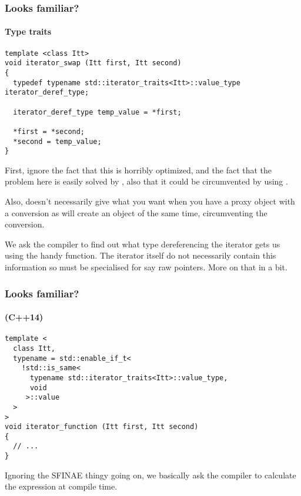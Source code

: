 \documentclass[11pt,a4paper,dvipsnames,usenames]{beamer}
\begin{document}
\begin{frame}[fragile]
  \frametitle{Looks familiar?}
  \framesubtitle{Type traits}

  \begin{lstlisting}
template <class Itt>
void iterator_swap (Itt first, Itt second)
{
  typedef typename std::iterator_traits<Itt>::value_type iterator_deref_type;

  iterator_deref_type temp_value = *first;

  *first = *second;
  *second = temp_value;
}
  \end{lstlisting}

  \note
  {
    First, ignore the fact that this is horribly optimized, and the fact that the problem here
    is easily solved by , also that it could be circumvented by using .

    \vspace{1em}

    Also,  doesn't necessarily give what you want when you have a proxy object with a conversion
    as  will create an object of the same time, circumventing the conversion.

    \vspace{1em}

    We ask the compiler to find out what type dereferencing the iterator gets us using the handy
     function. The iterator itself do not necessarily contain this information
    so  must be specialised for say raw pointers. More on that in a bit.
  }

\end{frame}

\begin{frame}[fragile]
  \frametitle{Looks familiar?}
  \framesubtitle{ (C++14)}

  \begin{lstlisting}
template <
  class Itt,
  typename = std::enable_if_t<
    !std::is_same<
      typename std::iterator_traits<Itt>::value_type,
      void
     >::value
  > 
>
void iterator_function (Itt first, Itt second)
{
  // ...
}
  \end{lstlisting}

  \note
  {
    Ignoring the SFINAE thingy going on, we basically ask the compiler to calculate the expression
     at compile time.
  }

\end{frame}
\end{document}
